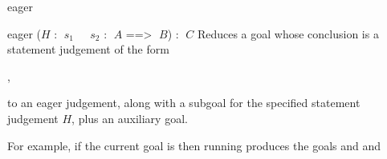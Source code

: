 \begin{tactic}{eager}
  \begin{tsyntax}{eager ($H$ : $\;s_1$ ~ $\;s_2$ :
    $\;A$ ==> $\;B$) : $\;C$}
   Reduces a goal whose conclusion is a \prhl statement judgement of
   the form
  \begin{center}
    ,
  \end{center}
  to an eager judgement, along with a subgoal for the specified
  \prhl statement judgement $H$, plus an auxiliary goal.

  \medskip
  For example, if the current goal is
   then
  running 
  produces the goals
  and
  and
  \end{tsyntax}
\end{tactic}
